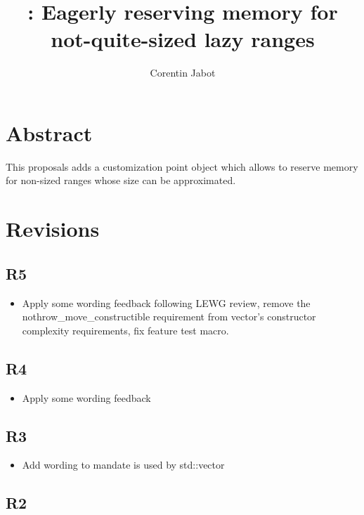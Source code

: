 \documentclass{wg21}
\title{\tcode{reserve\_hint}: Eagerly reserving memory for not-quite-sized lazy ranges}
\author{Corentin Jabot}{corentin.jabot@gmail.com}
\begin{document}
\maketitle

\section{Abstract}

This proposals adds a  customization point object which allows  to
reserve memory for non-sized ranges whose size can be approximated.

\section{Revisions}

\subsection{R5}

\begin{itemize}
\item Apply some wording feedback following LEWG review, remove the nothrow_move_constructible requirement from vector's constructor complexity requirements, fix feature test macro.
\end{itemize}

\subsection{R4}

\begin{itemize}
\item Apply some wording feedback
\end{itemize}


\subsection{R3}

\begin{itemize}
\item Add wording to mandate  is used by std::vector
\end{itemize}

\subsection{R2}
\end{document}
